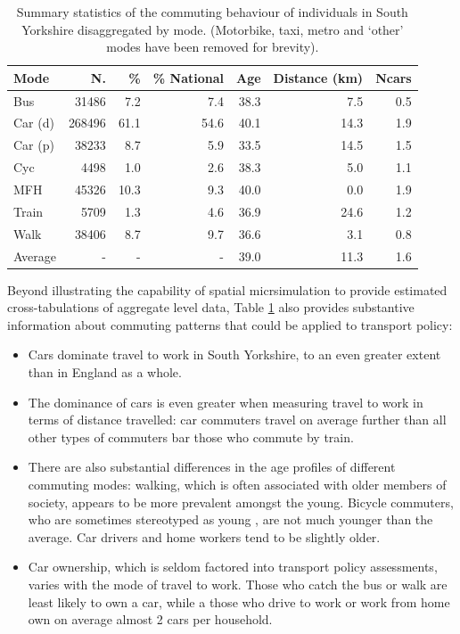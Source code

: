 \documentclass[a4paper, 11pt, twoside]{Thesis}
\begin{document}
\begin{table}[h]
\caption[Summary statistics of the commuting behaviour of in South Yorkshire]
{Summary statistics of the commuting behaviour of individuals in South
Yorkshire disaggregated by mode. (Motorbike, taxi, metro and `other'
modes have been removed for brevity).}
\begin{center}
\begin{tabular}{lrrrrrr}
\toprule
Mode & N.  & \%  & \% National & Age & Distance (km) &
Ncars \\
\midrule
Bus & 31486 & 7.2 & 7.4 & 38.3 & 7.5 & 0.5 \\ 
Car (d) & 268496 & 61.1 & 54.6 & 40.1 & 14.3 & 1.9 \\ 
Car (p) & 38233 & 8.7 & 5.9 & 33.5 & 14.5 & 1.5 \\ 
Cyc & 4498 & 1.0 & 2.6 & 38.3 & 5.0 & 1.1 \\ 
MFH & 45326 & 10.3 & 9.3 & 40.0 & 0.0 & 1.9 \\
Train & 5709 & 1.3 & 4.6 & 36.9 & 24.6 & 1.2 \\ 
Walk & 38406 & 8.7 & 9.7 & 36.6 & 3.1 & 0.8 \\ 
Average & - & - & - & 39.0 & 11.3 & 1.6 \\
\bottomrule
\end{tabular}\end{center}
\label{t:sum}
\end{table}

Beyond illustrating the capability of spatial micrsimulation to provide
estimated cross-tabulations of aggregate level data,
Table \ref{t:sum} also provides substantive information
about commuting patterns that could be applied to transport policy:
\begin{itemize}
 \item Cars dominate travel to work in South Yorkshire, to an
even greater extent than in England as a whole.
\item The dominance of cars is even greater when measuring travel
to work in terms of distance travelled: car commuters travel on
average further than all other types of commuters bar those who commute
by train.
\item There are also substantial differences in the age profiles of
different commuting modes: walking, which is often associated with older
members of society, appears to be more prevalent amongst the young. Bicycle commuters,
who are sometimes stereotyped as young \citep{Daley2011}, are not much younger
than the average. Car drivers and home workers tend to be slightly older.
\item Car ownership, which is seldom factored into transport policy assessments,
\citep{Kay2011}
varies with the mode of travel to work. Those who catch the bus or walk are least
likely to own a car, while a those who drive to work or work from home own on
average almost 2 cars per household.
\end{itemize}
\end{document}
